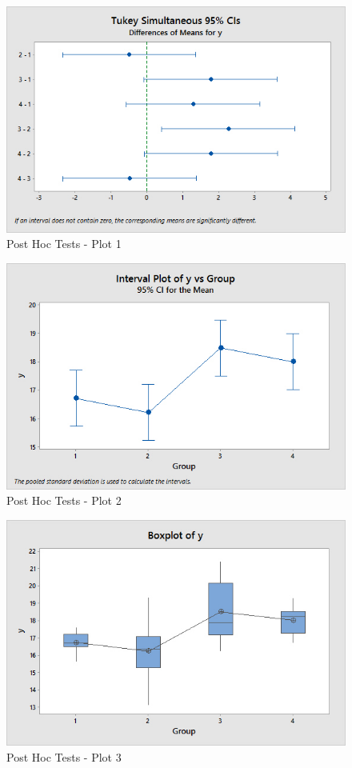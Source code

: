 \documentclass[a4paper,12pt]{article}
\begin{document}
\begin{figure}[h!]
\centering
\includegraphics[width=0.6\linewidth]{images/Repeat2017-Q2a-1}
\caption{Post Hoc Tests - Plot 1}
\label{fig:Repeat2017-Q2a-1}
\end{figure}

\newpage
\begin{figure}[h!]
	\centering
	\includegraphics[width=0.7\linewidth]{images/Repeat2017-Q2a-2}
\caption{Post Hoc Tests - Plot 2}
	\label{fig:Repeat2017-Q2a-2}
\end{figure}

\begin{figure}[h!]
	\centering
	\includegraphics[width=0.7\linewidth]{images/Repeat2017-Q2a-4}
\caption{Post Hoc Tests - Plot 3}
	\label{fig:Repeat2017-Q2a-4}
\end{figure}
\end{document}
